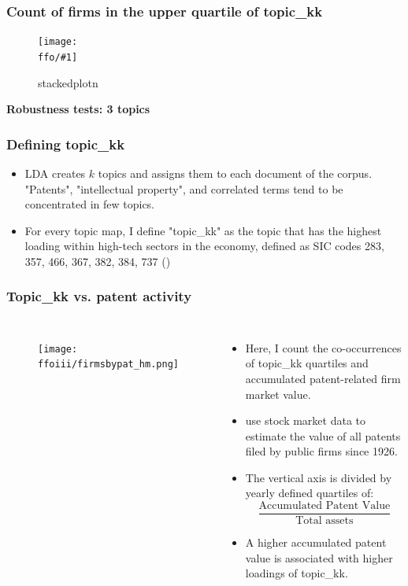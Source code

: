 \documentclass{beamer}
\newcommand{\ffo}{dicfullmc10thr10defnob40noa1_4t}
\newcommand{\ffoiii}{dicfullmc10thr10defnob5noa0_8_3t}
\newcommand{\insertfigure}[2]{
\begin{figure}[h!]
  \centering
  \texttt{[image: \\ffo/\#1]}
  \centering
  \captionsetup{font=scriptsize}
  \caption{#2}
  \label{fig:#1}
\end{figure}
}
\begin{document}
\begin{frame}
\frametitle{Count of firms in the upper quartile of topic\_kk}
\insertfigure{stackedplot_n}{stackedplotn}
\end{frame}

\begin{frame}
\label{robthree}
\centering
\huge\bfseries Robustness tests: 3 topics
\hyperlink{results}{}
\end{frame}

\begin{frame}
  \frametitle{Defining topic\_kk}
  \begin{itemize}
  \item LDA creates $k$ topics and assigns them to each document of the corpus. "Patents", "intellectual property", and correlated terms tend to be concentrated in few topics.
  \item For every topic map, I define "topic\_kk" as the topic that has the highest loading within high-tech sectors in the economy, defined as SIC codes 283, 357, 466, 367, 382, 384, 737 (\cite{Brown2009-zp}) 
  
\end{itemize}

\end{frame}


\begin{frame}
\frametitle{Topic\_kk vs. patent activity}
       \begin{columns}
             \begin{figure}[h!]
		  \centering
		  \texttt{[image: \\ffoiii/firmsbypat\_hm.png]}
		  \captionsetup{font=scriptsize}
		  \label{fig:firmsbypathm}
			\end{figure}
          \scriptsize
              \begin{itemize}
              \item Here, I count the co-occurrences of topic\_kk quartiles and accumulated patent-related firm market value.
              \item \cite{Kogan2017-fx} use stock market data to estimate the value of all patents filed by public firms since 1926.
			  \item The vertical axis is divided by yearly defined quartiles of:
			  \begin{equation}
  				\frac{\text{Accumulated Patent Value}}{\text{Total assets}}
				\end{equation}
			  \item A higher accumulated patent value is associated with higher loadings of topic\_kk.
			\end{itemize}
	  \end{columns} 
\end{frame}
\end{document}
